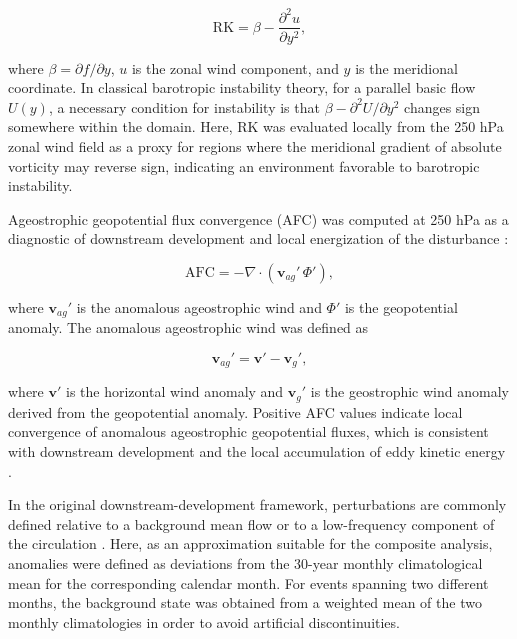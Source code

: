 \documentclass[pdflatex,sn-chicago]{sn-jnl}%
\theoremstyle{plain}
\theoremstyle{definition}
\theoremstyle{remark}
\theoremstyle{definition}
\begin{document}
\begin{equation}
\mathrm{RK}
=
\beta - \frac{\partial^2 u}{\partial y^2},
\end{equation}

where \(\beta = \partial f/\partial y\), \(u\) is the zonal wind component, and \(y\) is the meridional coordinate. In classical barotropic instability theory, for a parallel basic flow \(U(y)\), a necessary condition for instability is that \(\beta - \partial^2 U/\partial y^2\) changes sign somewhere within the domain. Here, \(\mathrm{RK}\) was evaluated locally from the 250 hPa zonal wind field as a proxy for regions where the meridional gradient of absolute vorticity may reverse sign, indicating an environment favorable to barotropic instability.


Ageostrophic geopotential flux convergence (AFC) was computed at 250 hPa as a diagnostic of downstream development and local energization of the disturbance \citep[e.g.][]{orlanski1991life,orlanski1993ageostrophic}:

\begin{equation}
\mathrm{AFC}
=
-\nabla \cdot \left( \mathbf{v}_{ag}' \, \Phi' \right),
\end{equation}

where \(\mathbf{v}_{ag}'\) is the anomalous ageostrophic wind and \(\Phi'\) is the geopotential anomaly. The anomalous ageostrophic wind was defined as

\begin{equation}
\mathbf{v}_{ag}' = \mathbf{v}' - \mathbf{v}_g',
\end{equation}

where \(\mathbf{v}'\) is the horizontal wind anomaly and \(\mathbf{v}_g'\) is the geostrophic wind anomaly derived from the geopotential anomaly. Positive AFC values indicate local convergence of anomalous ageostrophic geopotential fluxes, which is consistent with downstream development and the local accumulation of
eddy kinetic energy \citep[e.g.][]{orlanski1995stages,ndarana2021downstream,pinheiro2022contributions}.

In the original downstream-development framework, perturbations are commonly defined relative to a background mean flow or to a low-frequency component of the circulation \citep[e.g.][]{pinheiro2022contributions,pinheiro2024deepening}. Here, as an approximation suitable for the composite analysis, anomalies were defined as deviations from the 30-year monthly climatological mean for the corresponding calendar month. For events spanning two different months, the background state was obtained from a weighted mean of the two monthly climatologies in order to avoid artificial discontinuities.
\end{document}
